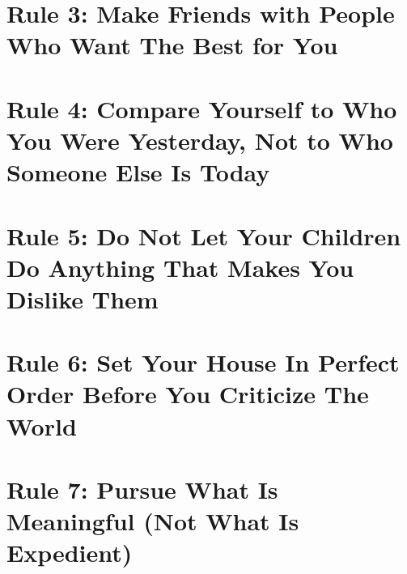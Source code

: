 \documentclass{article}
\numberwithin{equation}{section}
\begin{document}

\section{Rule 3: Make Friends with People Who Want The Best for You}


\section{Rule 4: Compare Yourself to Who You Were Yesterday, Not to Who Someone Else Is Today}


\section{Rule 5: Do Not Let Your Children Do Anything That Makes You Dislike Them}


\section{Rule 6: Set Your House In Perfect Order Before You Criticize The World}


\section{Rule 7: Pursue What Is Meaningful (Not What Is Expedient)}
\end{document}
